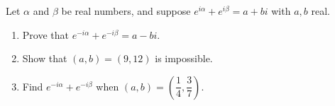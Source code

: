 Let $\alpha$ and $\beta$ be real numbers, and suppose $e^{i\alpha}+e^{i\beta}=a+bi$ with $a,b$ real.
\begin{enumerate}
\item[(a)] Prove that $e^{-i\alpha}+e^{-i\beta}=a-bi$.
\item[(b)] Show that $(a,b)=(9,12)$ is impossible.
\item[(c)] Find $e^{-i\alpha}+e^{-i\beta}$ when $(a,b)=\left(\dfrac14,\dfrac37\right)$.
\end{enumerate}
